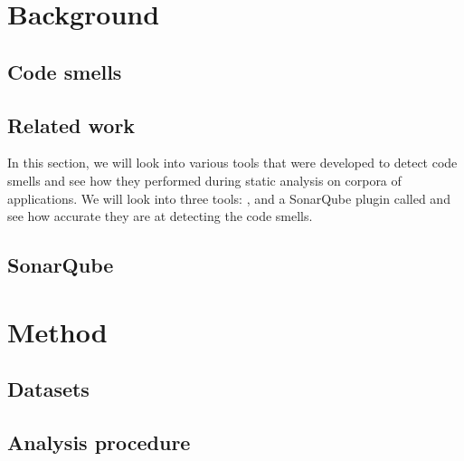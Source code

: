 \documentclass[12pt]{article}
\begin{document}
    

    \newpage

    \section{Background}\label{sec:background}

    \subsection{Code smells}\label{subsec:code-smells}

    

    \subsection{Related work}\label{subsec:related-work}

    In this section, we will look into various tools that were developed to detect code smells
    and see how they performed during static analysis on corpora of applications.
    We will look into three tools: ,  and a SonarQube plugin called
     and see how accurate they are at detecting the code smells.

    

    \subsection{SonarQube}\label{subsec:sonarqube}

    

    \newpage

    \section{Method}\label{sec:method}

    

    \subsection{Datasets}\label{subsec:datasets}

    

    \subsection{Analysis procedure}\label{subsec:analysis-procedure}
\end{document}
